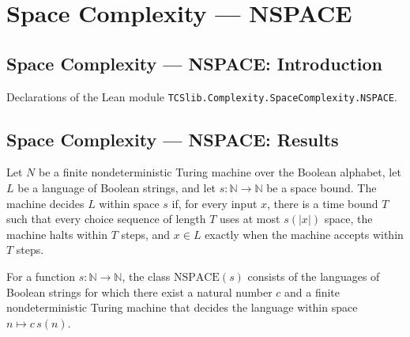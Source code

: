\section{Space Complexity --- NSPACE}
\subsection*{Space Complexity --- NSPACE: Introduction}

Declarations of the Lean module \texttt{TCSlib.Complexity.SpaceComplexity.NSPACE}.

\subsection*{Space Complexity --- NSPACE: Results}

\begin{definition}
\label{Turing.FinNDTM.DecidesInSpace}
\leanok
{}
Let $N$ be a finite nondeterministic Turing machine over the Boolean alphabet, let $L$
be a language of Boolean strings, and let $s:\mathbb{N}\to\mathbb{N}$ be a space bound.
The machine decides $L$ within space $s$ if, for every input $x$, there is a time bound
$T$ such that every choice sequence of length $T$ uses at most $s(|x|)$ space, the
machine halts within $T$ steps, and $x\in L$ exactly when the machine accepts within $T$
steps.
\end{definition}

\begin{definition}
\label{Complexity.NSPACE}
\leanok
{}
For a function $s:\mathbb{N}\to\mathbb{N}$, the class $\mathrm{NSPACE}(s)$ consists of
the languages of Boolean strings for which there exist a natural number $c$ and a finite
nondeterministic Turing machine that decides the language within space $n\mapsto
c\,s(n)$.
\end{definition}

